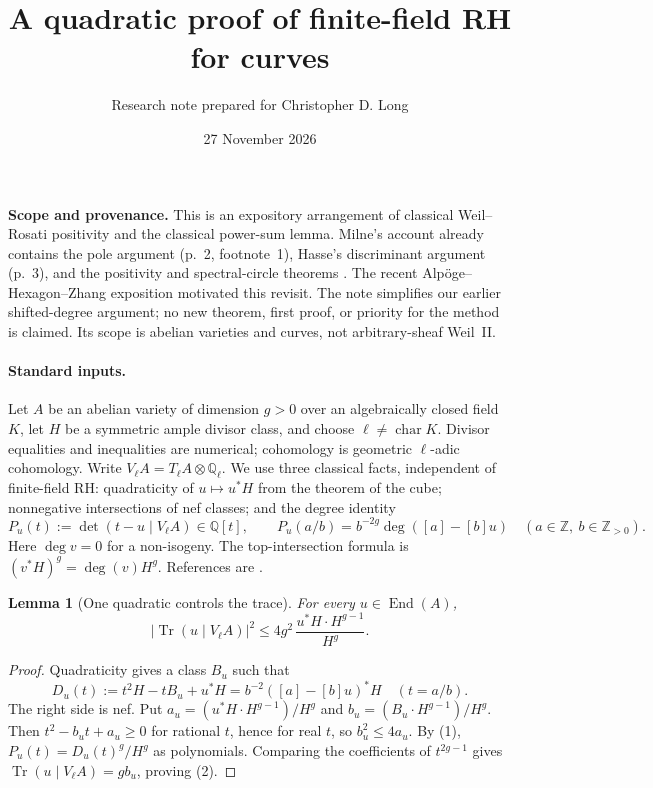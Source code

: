 \documentclass[11pt]{article}
\title{\vspace{-1.5em}A quadratic proof of finite-field RH for curves}
\author{\small Research note prepared for Christopher D. Long}
\date{\small 27 November 2026}
\newtheorem{lemma}[theorem]{Lemma}
\newcommand{\End}{\operatorname{End}}
\newcommand{\Tr}{\operatorname{Tr}}
\newcommand{\Q}{\mathbb Q}
\begin{document}
\maketitle
\vspace{-1.2em}
\noindent
\textbf{Scope and provenance.} This is an expository arrangement of classical
Weil--Rosati positivity and the classical power-sum lemma. Milne's account
already contains the pole argument (p.~2, footnote~1), Hasse's discriminant
argument (p.~3), and the positivity and spectral-circle theorems
\cite{Milne}. The recent Alp\"oge--Hexagon--Zhang exposition \cite{Zhang}
motivated this revisit. The note simplifies our earlier shifted-degree
argument; no new theorem, first proof, or priority for the method is claimed.
Its scope is abelian varieties and curves, not arbitrary-sheaf Weil~II.

\paragraph{Standard inputs.}
Let \(A\) be an abelian variety of dimension \(g>0\) over an algebraically
closed field \(K\), let \(H\) be a symmetric ample divisor class, and choose
\(\ell\ne\operatorname{char}K\). Divisor equalities and inequalities are
numerical; cohomology is geometric \(\ell\)-adic cohomology.
Write \(V_\ell A=T_\ell A\otimes\Q_\ell\).
We use three classical facts, independent of finite-field RH:
quadraticity of \(u\mapsto u^*H\) from the theorem of the cube;
nonnegative intersections of nef classes; and the degree identity
\[
 P_u(t):=\det(t-u\mid V_\ell A)\in\Q[t],
 \qquad
 P_u(a/b)=b^{-2g}\deg([a]-[b]u)
 \quad(a\in\mathbb Z,\ b\in\mathbb Z_{>0}).
 \tag{1}
\]
Here \(\deg v=0\) for a non-isogeny. The top-intersection formula is
\((v^*H)^g=\deg(v)H^g\). References are \cite{Milne,Kedlaya}.

\begin{lemma}[One quadratic controls the trace]\label{trace}
For every \(u\in\End(A)\),
\[
 \left|\Tr(u\mid V_\ell A)\right|^2
 \le 4g^2\,\frac{u^*H\cdot H^{g-1}}{H^g}.
 \tag{2}
\]
\end{lemma}
\begin{proof}
Quadraticity gives a class \(B_u\) such that
\[
 D_u(t):=t^2H-tB_u+u^*H
   =b^{-2}([a]-[b]u)^*H\quad(t=a/b).
\]
The right side is nef. Put
\(a_u=(u^*H\cdot H^{g-1})/H^g\) and
\(b_u=(B_u\cdot H^{g-1})/H^g\).
Then \(t^2-b_ut+a_u\ge0\) for rational \(t\), hence for real \(t\), so
\(b_u^2\le4a_u\).
By (1), \(P_u(t)=D_u(t)^g/H^g\) as polynomials.
Comparing the coefficients of \(t^{2g-1}\) gives
\(\Tr(u\mid V_\ell A)=g b_u\), proving (2).
\end{proof}
\end{document}
